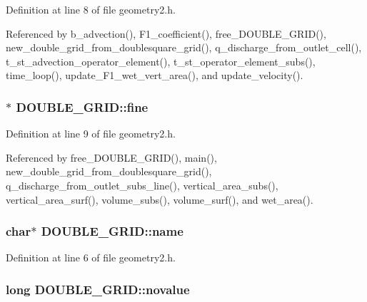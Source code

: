 Definition at line 8 of file geometry2.\-h.



Referenced by b\-\_\-advection(), F1\-\_\-coefficient(), free\-\_\-\-D\-O\-U\-B\-L\-E\-\_\-\-G\-R\-I\-D(), new\-\_\-double\-\_\-grid\-\_\-from\-\_\-doublesquare\-\_\-grid(), q\-\_\-discharge\-\_\-from\-\_\-outlet\-\_\-cell(), t\-\_\-st\-\_\-advection\-\_\-operator\-\_\-element(), t\-\_\-st\-\_\-operator\-\_\-element\-\_\-subs(), time\-\_\-loop(), update\-\_\-\-F1\-\_\-wet\-\_\-vert\-\_\-area(), and update\-\_\-velocity().

\hypertarget{struct_d_o_u_b_l_e___g_r_i_d_a8690f5b1ae56932e6db1ad50c318d050}{
\subsubsection[{fine}]{$\ast$ D\-O\-U\-B\-L\-E\-\_\-\-G\-R\-I\-D\-::fine}}\label{struct_d_o_u_b_l_e___g_r_i_d_a8690f5b1ae56932e6db1ad50c318d050}


Definition at line 9 of file geometry2.\-h.



Referenced by free\-\_\-\-D\-O\-U\-B\-L\-E\-\_\-\-G\-R\-I\-D(), main(), new\-\_\-double\-\_\-grid\-\_\-from\-\_\-doublesquare\-\_\-grid(), q\-\_\-discharge\-\_\-from\-\_\-outlet\-\_\-subs\-\_\-line(), vertical\-\_\-area\-\_\-subs(), vertical\-\_\-area\-\_\-surf(), volume\-\_\-subs(), volume\-\_\-surf(), and wet\-\_\-area().

\hypertarget{struct_d_o_u_b_l_e___g_r_i_d_a0339d26509edeee1d0f65e27ddbdbdc2}{
\subsubsection[{name}]{\setlength{\rightskip}{0pt plus 5cm}char$\ast$ D\-O\-U\-B\-L\-E\-\_\-\-G\-R\-I\-D\-::name}}\label{struct_d_o_u_b_l_e___g_r_i_d_a0339d26509edeee1d0f65e27ddbdbdc2}


Definition at line 6 of file geometry2.\-h.

\hypertarget{struct_d_o_u_b_l_e___g_r_i_d_acb602224bc4b7fe8ba49abeae8704387}{
\subsubsection[{novalue}]{\setlength{\rightskip}{0pt plus 5cm}long D\-O\-U\-B\-L\-E\-\_\-\-G\-R\-I\-D\-::novalue}}\label{struct_d_o_u_b_l_e___g_r_i_d_acb602224bc4b7fe8ba49abeae8704387}


